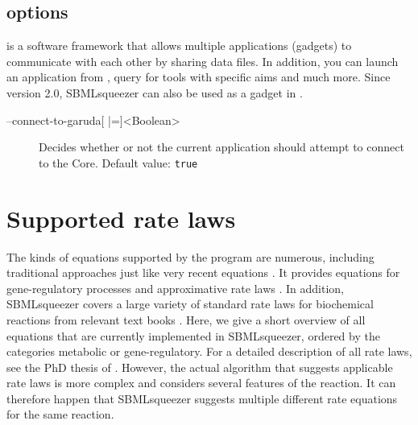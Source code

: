 \section{\Garuda options}

\Garuda is a software framework that allows multiple applications (gadgets) to
communicate with each other by sharing data files. In addition, you can launch
an application from \Garuda, query for tools with specific aims and much more.
Since version 2.0, SBMLsqueezer can also be used as a gadget in \Garuda.

\begin{description}
\item[--connect-to-garuda{[} |={]}<Boolean>]
  Decides whether or not the current application should attempt to connect to
  the \Garuda Core. Default value: \texttt{true}
\end{description}
\renewcommand{\descriptionlabel}[1]{\textcolor{black}{\textbf{#1}}}

\chapter{Supported rate laws}\label{chap:RateLaws}

The kinds of equations supported by the program are
numerous, including traditional approaches \citep{Guldberg1879, Michaelis1913}
just like very recent equations \citep{Liebermeister2006, Liebermeister2010}.
It provides equations for gene-regulatory processes
\citep{Hinze2007, Radde2007a, Toepfer2007, Vu2007,Weaver1999} and approximative
rate laws \citep{Savageau1969}.
In addition, SBMLsqueezer covers a large variety of standard rate laws for
biochemical reactions from relevant text books
\citep{Segel1993, Heinrich1996, Bisswanger2000, Cornish-Bowden2004}.
Here, we give a short overview of all equations that are currently implemented
in SBMLsqueezer, ordered by the categories metabolic or gene-regulatory.
For a detailed description of all rate laws, see the PhD thesis of \citealp{Draeger2011a}.
However, the actual algorithm that suggests applicable rate laws is more complex
and considers several features of the reaction.
It can therefore happen that SBMLsqueezer suggests multiple different rate
equations for the same reaction.

